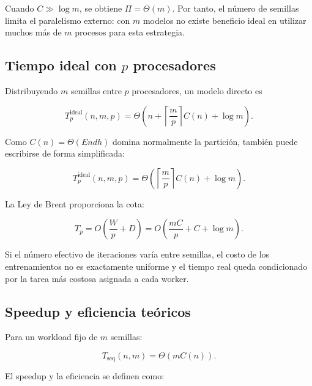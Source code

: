 \documentclass[11pt,a4paper]{article}
\newcommand{\Work}{W}
\newcommand{\Depth}{D}
\newcommand{\Cost}{C}
\begin{document}
Cuando $\Cost\gg\log m$, se obtiene $\Pi=\Theta(m)$. Por tanto, el número de semillas
limita el paralelismo externo: con $m$ modelos no existe beneficio ideal en utilizar
muchos más de $m$ procesos para esta estrategia.

\subsection{Tiempo ideal con $p$ procesadores}

Distribuyendo $m$ semillas entre $p$ procesadores, un modelo directo es

\begin{equation}
    T_p^{\mathrm{ideal}}(n,m,p)
    =
    \Theta\left(
        n+
        \left\lceil\frac{m}{p}\right\rceil\Cost(n)
        +\log m
    \right).
    \label{eq:tp-directo}
\end{equation}

Como $\Cost(n)=\Theta(E n d h)$ domina normalmente la partición, también puede
escribirse de forma simplificada:

\begin{equation}
    T_p^{\mathrm{ideal}}(n,m,p)
    =
    \Theta\left(
        \left\lceil\frac{m}{p}\right\rceil\Cost(n)
        +\log m
    \right).
\end{equation}

La Ley de Brent proporciona la cota:

\begin{equation}
    T_p
    =
    O\left(
        \frac{\Work}{p}+\Depth
    \right)
    =
    O\left(
        \frac{m\Cost}{p}
        +\Cost
        +\log m
    \right).
    \label{eq:brent}
\end{equation}

Si el número efectivo de iteraciones varía entre semillas, el costo de los entrenamientos
no es exactamente uniforme y el tiempo real queda condicionado por la tarea más costosa
asignada a cada worker.

\subsection{Speedup y eficiencia teóricos}

Para un workload fijo de $m$ semillas:

\begin{equation}
    T_{\mathrm{seq}}(n,m)
    =
    \Theta(m\Cost(n)).
\end{equation}

El speedup y la eficiencia se definen como:
\end{document}
